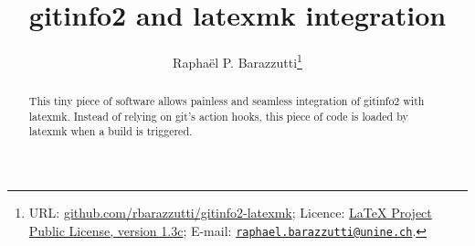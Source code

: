 \documentclass[A4]{ltxdoc}
\begin{document}
\thispagestyle{plain}
\title{gitinfo2 and latexmk integration}
\renewcommand{\gitMark}{
Release:\gitReln{}: \gitAbbrevHash{} (\gitAuthorDate)}
\author{%
  Raphaël P. Barazzutti\thanks{%
    URL: \href{https://github.com/rbarazzutti/gitinfo2-latexmk}{github.com/rbarazzutti/gitinfo2-latexmk};
    Licence: \href{http://latex-project.org/lppl/lppl-1-3c.txt}{LaTeX Project Public License, version 1.3c};
    E-mail: \href{mailto:raphael.barazzutti@unine.ch}{\tt raphael.barazzutti@unine.ch}.}}

\maketitle
\thispagestyle{plain}
\begin{abstract}
    This tiny piece of software allows painless and seamless integration of \textsf{gitinfo2} with \textsf{latexmk}. Instead of relying on \textsf{git}'s action hooks, this piece of code is loaded
    by \textsf{latexmk} when a build is triggered.
\end{abstract}

\end{document}
